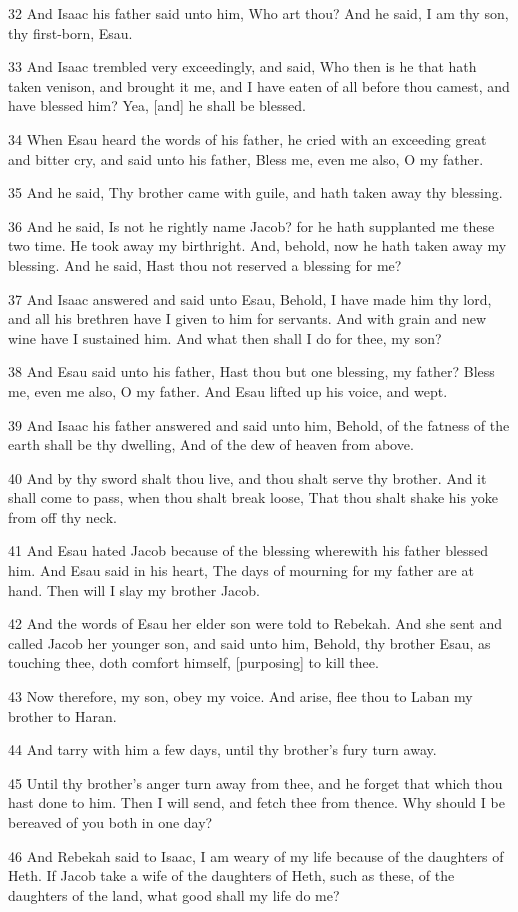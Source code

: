 \par 32 And Isaac his father said unto him, Who art thou? And he said, I am thy son, thy first-born, Esau.
\par 33 And Isaac trembled very exceedingly, and said, Who then is he that hath taken venison, and brought it me, and I have eaten of all before thou camest, and have blessed him? Yea, [and] he shall be blessed.
\par 34 When Esau heard the words of his father, he cried with an exceeding great and bitter cry, and said unto his father, Bless me, even me also, O my father.
\par 35 And he said, Thy brother came with guile, and hath taken away thy blessing.
\par 36 And he said, Is not he rightly name Jacob? for he hath supplanted me these two time. He took away my birthright. And, behold, now he hath taken away my blessing. And he said, Hast thou not reserved a blessing for me?
\par 37 And Isaac answered and said unto Esau, Behold, I have made him thy lord, and all his brethren have I given to him for servants. And with grain and new wine have I sustained him. And what then shall I do for thee, my son?
\par 38 And Esau said unto his father, Hast thou but one blessing, my father? Bless me, even me also, O my father. And Esau lifted up his voice, and wept.
\par 39 And Isaac his father answered and said unto him, Behold, of the fatness of the earth shall be thy dwelling, And of the dew of heaven from above.
\par 40 And by thy sword shalt thou live, and thou shalt serve thy brother. And it shall come to pass, when thou shalt break loose, That thou shalt shake his yoke from off thy neck.
\par 41 And Esau hated Jacob because of the blessing wherewith his father blessed him. And Esau said in his heart, The days of mourning for my father are at hand. Then will I slay my brother Jacob.
\par 42 And the words of Esau her elder son were told to Rebekah. And she sent and called Jacob her younger son, and said unto him, Behold, thy brother Esau, as touching thee, doth comfort himself, [purposing] to kill thee.
\par 43 Now therefore, my son, obey my voice. And arise, flee thou to Laban my brother to Haran.
\par 44 And tarry with him a few days, until thy brother's fury turn away.
\par 45 Until thy brother's anger turn away from thee, and he forget that which thou hast done to him. Then I will send, and fetch thee from thence. Why should I be bereaved of you both in one day?
\par 46 And Rebekah said to Isaac, I am weary of my life because of the daughters of Heth. If Jacob take a wife of the daughters of Heth, such as these, of the daughters of the land, what good shall my life do me?


